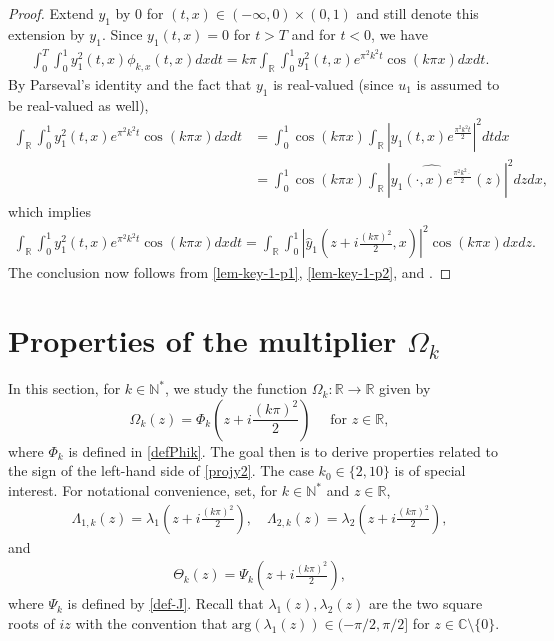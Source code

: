 \documentclass[11pt, reqno]{amsart}
\theoremstyle{plain}
\numberwithin{equation}{section}
\newcommand{\mR}{\mathbb{R}}
\newcommand{\mC}{\mathbb{C}}
\newcommand{\mN}{\mathbb{N}}
\newcommand{\hy}{\hat y}
\begin{document}
\begin{proof} Extend $y_1$ by 0 for $(t, x) \in (-\infty, 0) \times (0, 1)$ and still denote this extension by $y_1$. Since $y_1(t, x) = 0$ for $t > T$ and for $t < 0$,  we have
\begin{align}	\label{lem-key-1-p1}
	\int_0^T \int_0^1 y^2_1(t, x) \phi_{k, x}(t, x) dx dt = k \pi \int_{\mR} \int_0^1 y_1^2(t, x) e^{\pi^2 k^2 t} \cos(k \pi x) dx dt.
\end{align}
By Parseval's identity and the fact that $y_1$ is real-valued (since $u_1$ is assumed to be real-valued as well), 
    \begin{align*}
    \int_{\mathbb{R}} \int_0^1 y_1^2(t, x) e^{\pi^2 k^2 t} \cos (k \pi x) dx dt 
	&=  \int_0^1  \cos (k\pi x) \int_{\mathbb{R}} \left|y_1(t, x) e^{\frac{\pi^2 k^2 t}{2}} \right|^2 dt   dx \\
    &=  \int_0^1  \cos(k \pi x) \int_{\mathbb{R}} \left|\widehat{y_1(\cdot, x) e^{\frac{\pi^2 k^2 \cdot}{2}}} (z) \right|^2 dz   dx, 
    \end{align*}
which implies
    \begin{align}	\label{lem-key-1-p2}
       \int_{\mathbb{R}} \int_0^1 y_1^2(t, x) e^{\pi^2 k^2 t} \cos (k \pi x) dx dt = \int_{\mathbb{R}} \int_0^1 \left|\hy_1 \left(z + i \frac{(k \pi)^2}{2}, x \right) \right|^2 \cos (k \pi x) dx  dz.
    \end{align}
The conclusion now follows from \eqref{lem-key-1-p1}, \eqref{lem-key-1-p2}, and . 
\end{proof}

    
\section{Properties of the multiplier \texorpdfstring{$\Omega_k$}{Omega k}} \label{sect-key-2}

In this section, for $k \in \mN^*$, we study the function $\Omega_k: \mR \to \mR$ given by
$$
 \Omega_k (z)  = \Phi_k \left(z + i\frac{(k \pi)^2}{2} \right) \quad \text{ for } z \in \mR, 
$$
where $\Phi_k$ is defined in \eqref{defPhik}.  The goal then is to derive properties related to the sign of the left-hand side of \eqref{projy2}. The case $k_0 \in \{2, 10\}$ is of special interest. For notational convenience, set, for $k \in \mN^*$ and $z \in \mathbb{R}$,
\begin{align}\label{def-Lambda}	
	\Lambda_{1,k}(z) = \lambda_{1}\left(z + i \frac{(k \pi)^2}{2} \right), \quad \Lambda_{2,k}(z) =  \lambda_2\left(z + i \frac{(k \pi)^2}{2} \right), 
\end{align}
and 
\begin{align}\label{def-I}
\Theta_k(z) = \Psi_k\left(z + i \frac{(k \pi)^2}{2} \right),
\end{align}
where $\Psi_k$ is defined by \eqref{def-J}.  Recall that $\lambda_1(z), \lambda_2(z)$ are the two square roots of $iz$ with the convention that $\mathrm{arg}(\lambda_1(z)) \in (-\pi/2, \pi/2]$ for $z \in \mC \setminus \{0\}$. 
\end{document}
